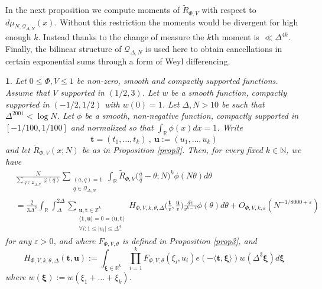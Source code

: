 \documentclass[12pt,reqno]{amsart}
\theoremstyle{plain}
\numberwithin{equation}{section}
\numberwithin{figure}{section}
\theoremstyle{plain}
\newtheorem{prop}{\protect\propositionname}
\theoremstyle{definition}
\theoremstyle{remark}
\providecommand{\propositionname}{Proposition}
\begin{document}
In the next proposition we compute moments of $\tilde{R}_{\Phi, V}$ with respect to $d \mu_{ N, \mathcal{Q}_{\Delta, N}}(x)$. Without this restriction the moments would be divergent for high enough $k$. Instead thanks to the change of measure the $k$th moment is $\ll \Delta^{4 k}$. %
Finally, the bilinear structure of $\mathcal{Q}_{\Delta, N}$ is used here to obtain cancellations in certain exponential sums through a form of Weyl differencing.
\begin{prop} \label{prop4}
  Let $0 \leq \Phi, V \leq 1$ be non-zero, smooth and compactly supported functions. 
  Assume that $V$ supported in $(1/2,3)$. Let $w$ be a smooth function, compactly supported in $(-1/2,1/2)$ with $w(0) = 1$. 
  Let $\Delta, N > 10$ be such that $\Delta^{2001} < \log N$. 
  Let $\phi$ be a smooth, non-negative function, compactly supported in $[- 1 /100, 1 /100]$ and normalized
  so that $\int_{\mathbb{R}} \phi(x) dx = 1$. 
  Write
  $$
  \boldsymbol{t} = (t_1, \ldots, t_{k}) \ , \ \boldsymbol{u} := (u_1, \ldots, u_k)
  $$
  and let $\widetilde{R}_{\Phi, V}(x; N)$ be as in Proposition \ref{prop3}. 
  Then, for every fixed $k \in \mathbb{N}$, 
  we have
  \begin{align*}
 & \frac{N}{\sum_{\substack{q \in \mathcal{Q}_{\Delta, N}}} \varphi(q)} \sum_{\substack{(a,q) = 1 \\ q \in \mathcal{Q}_{\Delta, N}}} \int_{\mathbb{R}} \widetilde{R}_{\Phi, V} \Big (\frac aq - \theta; N \Big )^k \phi(N \theta ) d \theta \\ & = \frac{2}{3 \Delta^2} \int_{\mathbb{R}} \int_{\Delta}^{2 \Delta} \sum_{\substack{\boldsymbol{u}, \boldsymbol{t} \in \mathbb{Z}^k \\ \langle \boldsymbol{1}, \boldsymbol{u} \rangle = 0 = \langle \boldsymbol{u}, \boldsymbol{t} \rangle \\ \forall i :  1 \leq |u_i| \leq \Delta^{4}}} H_{\Phi, V, k, \theta, \Delta} \Big ( \frac{\boldsymbol{t}}{v}, \frac{\boldsymbol{u}}{v} \Big ) \frac{dv}{v^{k - 1}} \phi(\theta) d \theta + O_{\Phi, V, k, \varepsilon}(N^{-1/8000 + \varepsilon})
  \end{align*}
  for any $\varepsilon > 0$, and 
  where $F_{\Phi, V, \theta}$ is defined in Proposition \ref{prop3}, and
  $$
  H_{\Phi, V, k, \theta, \Delta} (\boldsymbol{t}, \boldsymbol{u}) 
  := \int_{\boldsymbol{\xi} \in \mathbb{R}^k} \prod_{i = 1}^{k} 
  F_{\Phi, V, \theta}(\xi_i, u_i) 
  e ( - \langle \boldsymbol{t}, \boldsymbol{\xi} \rangle ) 
  w(\Delta^3 \boldsymbol{\xi}) d \boldsymbol{\xi}
  $$
  where $w(\boldsymbol{\xi}) := w(\xi_1 + \ldots + \xi_k)$.
\end{prop}
\end{document}
